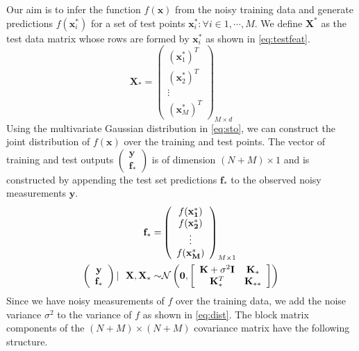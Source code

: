 Our aim is to infer the function $f(\mathbf{x})$ from the noisy training data and generate 
predictions $f(\mathbf{x}^{*}_i)$ for a set of test points 
${\mathbf{x}^{*}_i : \forall i \in 1, \cdots, M}$. We define $\mathbf{X}^*$ as the test data 
matrix whose rows are formed by $\mathbf{x}^{*}_i$ as shown in \cref{eq:testfeat}. 
%
\begin{equation}
    \mathbf{X}_* = \left( \begin{array}{c} (\mathbf{x}^{*}_1)^T \\ (\mathbf{x}^{*}_2)^T \\ \vdots \\ (\mathbf{x}^{*}_M)^T \end{array} \right)_{M \times d} \label{eq:testfeat} 
\end{equation}
%
Using the multivariate Gaussian distribution in \cref{eq:sto}, we can construct the joint 
distribution of $f(\mathbf{x})$ over the training and test points. The vector of training and test 
outputs $\left( \begin{array}{c} \mathbf{y} \\ \mathbf{f_*} \end{array} \right)$ is of dimension 
$(N+M) \times 1$ and is constructed by appending the test set predictions $\mathbf{f}_*$ to the 
observed noisy measurements $\mathbf{y}$.
%
\begin{align}
    \mathbf{f}_* = & \left( \begin{array}{c} f(\mathbf{x^{*}_1}) \\ f(\mathbf{x^{*}_2}) \\ \vdots \\ f(\mathbf{x^{*}_M}) \end{array} \right)_{M \times 1} \\
     \vspace{4\baselineskip}
    \left( \begin{array}{c} \mathbf{y} \\ \mathbf{f_*} \end{array} \right) | \ \ \mathbf{X}, \mathbf{X}_* \sim & 
    \mathcal{N}\left(\mathbf{0}, \left[ \begin{array}{cc} \mathbf{K} + \sigma^{2} \mathbf{I} & \mathbf{K}_{*} \\ \mathbf{K}_{*}^T & \mathbf{K}_{**} \end{array} \right ] \right) \label{eq:dist}
\end{align}
%
Since we have noisy measurements of $f$ over the training data, we add the noise variance 
$\sigma^2$ to the variance of $f$ as shown in \cref{eq:dist}. The block matrix components of the 
$(N+M) \times (N+M)$ covariance matrix have the following structure.

